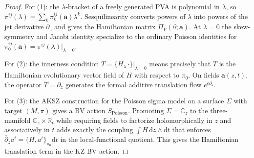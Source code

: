 \begin{proof}
For (1): the $\lambda$-bracket of a freely generated PVA is polynomial in
$\lambda$, so $\pi^{ij}(\lambda)=\sum_k\pi^{ij}_k(\boldsymbol a)\lambda^k$.
Sesquilinearity converts powers of $\lambda$ into powers of the jet derivative
$\partial_z$ and gives the Hamiltonian matrix $\Pi_V(\partial;\boldsymbol a)$.
At $\lambda=0$ the skew-symmetry and Jacobi identity specialize to the ordinary
Poisson identities for $\pi_0^{ij}(\boldsymbol a)=\pi^{ij}(\lambda)|_{\lambda=0}$.

For (2): the innerness condition $T = \{H_\lambda\,\cdot\}|_{\lambda=0}$ means
precisely that $T$ is the Hamiltonian evolutionary vector field of $H$ with respect to
$\pi_0$. On fields $\boldsymbol a(z,t)$, the operator $T=\partial_z$ generates
the formal additive translation flow $e^{\epsilon\partial_z}$.

For (3): the AKSZ construction for the Poisson sigma model on a surface
$\Sigma$ with target $(M,\pi)$ gives a BV action $S_{\mathrm{Poisson}}$.
Promoting $\Sigma = \mathbb C_z$ to the three-manifold
$\mathbb C_z\times\mathbb R_t$ while requiring fields to factorize
holomorphically in $z$ and associatively in $t$ adds exactly the coupling
$\int H\,\mathrm{d}\bar z\wedge\mathrm{d}t$ that enforces
$\bar\partial_z a^i = \{H,a^i\}_{\pi_0}\mathrm{d}t$ in the local-functional
quotient. This gives the Hamiltonian translation term in the KZ BV action.
\end{proof}

